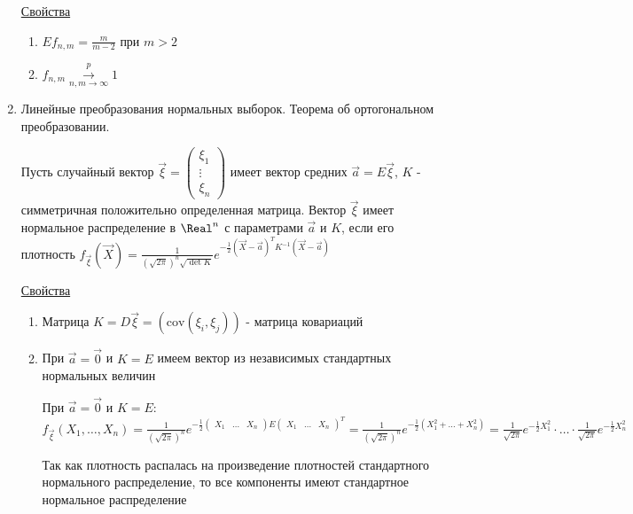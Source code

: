 \begin{enumerate}
    \underline{Свойства}

    \begin{enumerate}
        \item $E f_{n,m} = \frac{m}{m - 2}$ при $m > 2$

        \item $f_{n,m} \overset{p}{\underset{n, m \to \infty}{\longrightarrow}} 1$
    \end{enumerate}

    \item Линейные преобразования нормальных выборок. Теорема об ортогональном преобразовании.

    \Def Пусть случайный вектор $\vec \xi = \begin{pmatrix}\xi_1 \\ \vdots \\ \xi_n\end{pmatrix}$ имеет вектор средних 
    $\vec a = E \vec \xi$, $K$ - симметричная положительно определенная матрица. Вектор $\vec \xi$ 
    имеет нормальное распределение в $\Real^n$ с параметрами $\vec a$ и $K$, если его плотность 
    $f_{\vec \xi} (\vec X) = \frac{1}{\left(\sqrt{2\pi}\right)^n \sqrt{\det K}} e^{-\frac{1}{2} (\vec X - \vec a)^T K^{-1} (\vec X - \vec a)}$


    \underline{Свойства}

    \begin{enumerate}
        \item Матрица $K = D \vec \xi = \left(\mathrm{cov} (\xi_i, \xi_j)\right)$ - матрица ковариаций

        \item При $\vec a = \vec 0$ и $K = E$ имеем вектор из независимых стандартных нормальных величин

        \begin{MyProof}
            При $\vec a = \vec 0$ и $K = E$: $f_{\vec \xi} (X_1, \dots, X_n) = \frac{1}{\left(\sqrt{2\pi}\right)^n} 
            e^{-\frac{1}{2} \begin{pmatrix}X_1 & \dots & X_n\end{pmatrix} E \begin{pmatrix}X_1 & \dots & X_n\end{pmatrix}^T} = 
            \frac{1}{\left(\sqrt{2\pi}\right)^n} e^{-\frac{1}{2} (X_1^2 + \dots + X_n^2)} = 
            \frac{1}{\sqrt{2\pi}} e^{-\frac{1}{2} X_1^2} \cdot \dots \cdot \frac{1}{\sqrt{2\pi}} e^{-\frac{1}{2} X_n^2}$

            Так как плотность распалась на произведение плотностей стандартного нормального распределение, то все компоненты имеют стандартное нормальное распределение
        \end{MyProof}


\end{enumerate}
\end{enumerate}
